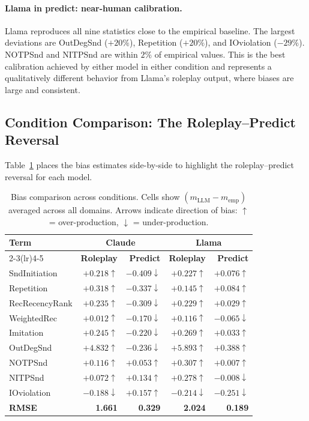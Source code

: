 \documentclass[11pt]{article}
\begin{document}
\paragraph{Llama in predict: near-human calibration.}
Llama reproduces all nine statistics close to the empirical baseline.
The largest deviations are OutDegSnd ($+20\%$), Repetition ($+20\%$),
and IOviolation ($-29\%$). NOTPSnd and NITPSnd are within $2\%$ of
empirical values. This is the best calibration achieved by either model
in either condition and represents a qualitatively different behavior
from Llama's roleplay output, where biases are large and consistent.

\subsection{Condition Comparison: The Roleplay--Predict Reversal}

Table~\ref{tab:compare} places the bias estimates side-by-side to
highlight the roleplay--predict reversal for each model.

\begin{table}[H]
\centering
\caption{Bias comparison across conditions. Cells show
$(m_{\text{LLM}} - m_{\text{emp}})$ averaged across all domains.
Arrows indicate direction of bias: $\uparrow$ = over-production,
$\downarrow$ = under-production.}
\label{tab:compare}
\begin{tabular}{lrrrr}
\toprule
\multirow{2}{*}{\textbf{Term}} &
\multicolumn{2}{c}{\textbf{Claude}} &
\multicolumn{2}{c}{\textbf{Llama}} \\
\cmidrule(lr){2-3}\cmidrule(lr){4-5}
& \textbf{Roleplay} & \textbf{Predict} & \textbf{Roleplay} & \textbf{Predict} \\
\midrule
SndInitiation  & $+0.218\uparrow$ & $-0.409\downarrow$ & $+0.227\uparrow$ & $+0.076\uparrow$ \\
Repetition     & $+0.318\uparrow$ & $-0.337\downarrow$ & $+0.145\uparrow$ & $+0.084\uparrow$ \\
RecRecencyRank & $+0.235\uparrow$ & $-0.309\downarrow$ & $+0.229\uparrow$ & $+0.029\uparrow$ \\
WeightedRec    & $+0.012\uparrow$ & $-0.170\downarrow$ & $+0.116\uparrow$ & $-0.065\downarrow$ \\
Imitation      & $+0.245\uparrow$ & $-0.220\downarrow$ & $+0.269\uparrow$ & $+0.033\uparrow$ \\
OutDegSnd      & $+4.832\uparrow$ & $-0.236\downarrow$ & $+5.893\uparrow$ & $+0.388\uparrow$ \\
NOTPSnd        & $+0.116\uparrow$ & $+0.053\uparrow$   & $+0.307\uparrow$ & $+0.007\uparrow$ \\
NITPSnd        & $+0.072\uparrow$ & $+0.134\uparrow$   & $+0.278\uparrow$ & $-0.008\downarrow$ \\
IOviolation    & $-0.188\downarrow$ & $+0.157\uparrow$ & $-0.214\downarrow$ & $-0.251\downarrow$ \\
\midrule
\textbf{RMSE} & \textbf{1.661} & \textbf{0.329} & \textbf{2.024} & \textbf{0.189} \\
\bottomrule
\end{tabular}
\end{table}
\end{document}
